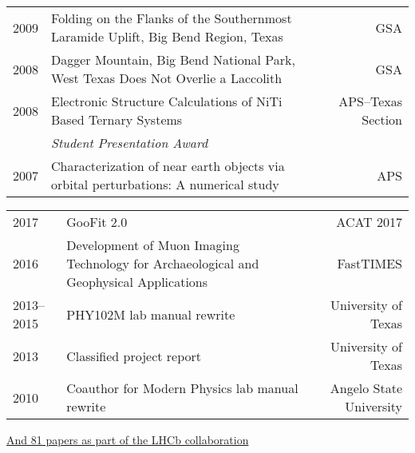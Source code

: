 \documentclass[10pt,letterpaper,english]{moderncv}
\begin{document}
\begin{tabularx}{\textwidth}{p{.35in}Xr}
	  2009 & Folding on the Flanks of the Southernmost Laramide Uplift, Big Bend Region, Texas & GSA \\[1em]
	  
	  2008 & Dagger Mountain, Big Bend National Park, West Texas Does Not Overlie a Laccolith & GSA \\[1em]
	 
	 2008 & Electronic Structure Calculations of NiTi Based Ternary Systems  & APS--Texas Section \\
	 & \emph{Student Presentation Award} & \\
	 
	 2007 & Characterization of near earth objects via orbital perturbations: A numerical study & APS \\
	 
\end{tabularx}






\begin{tabularx}{\textwidth}{p{.8in}Xr}

2017 & GooFit 2.0 & ACAT 2017 \\ %
2016 & Development of Muon Imaging Technology
for Archaeological and Geophysical Applications & FastTIMES \\
2013--2015 & PHY102M lab manual rewrite & University of Texas \\
2013 & Classified project report & University of Texas\\
2010 & Coauthor for Modern Physics lab manual rewrite & Angelo State University\\
\end{tabularx}
\href{http://inspirehep.net/search?ln=en&p=find+jy+2017+or+jy+2018+and+author+schreiner+and+author+sokoloff&of=hb&action_search=Search&sf=earliestdate&so=d}
{And 81 papers as part of the LHCb collaboration}
\end{document}
